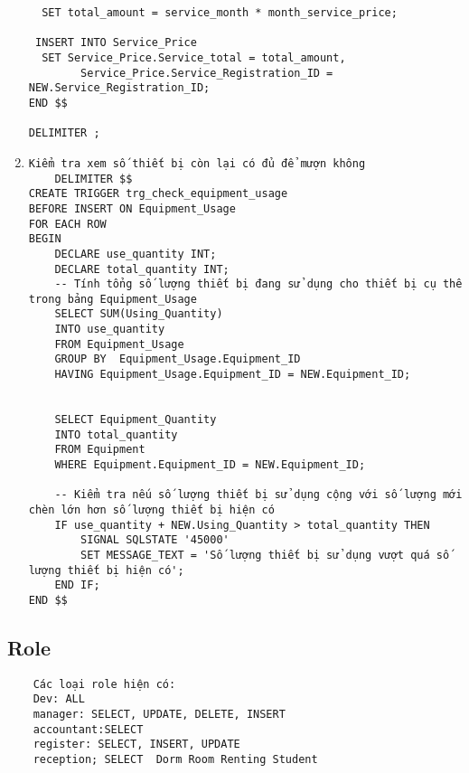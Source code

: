 \documentclass[a4paper,12pt]{article}
\begin{document}
\begin{enumerate}
\begin{verbatim}
  SET total_amount = service_month * month_service_price;

 INSERT INTO Service_Price 
  SET Service_Price.Service_total = total_amount,
		Service_Price.Service_Registration_ID = NEW.Service_Registration_ID;
END $$

DELIMITER ;
    \end{verbatim}
    \item \begin{verbatim}
Kiểm tra xem số thiết bị còn lại có đủ để mượn không
    DELIMITER $$
CREATE TRIGGER trg_check_equipment_usage
BEFORE INSERT ON Equipment_Usage
FOR EACH ROW
BEGIN
    DECLARE use_quantity INT;
    DECLARE total_quantity INT;
    -- Tính tổng số lượng thiết bị đang sử dụng cho thiết bị cụ thể trong bảng Equipment_Usage
    SELECT SUM(Using_Quantity)
    INTO use_quantity
    FROM Equipment_Usage
    GROUP BY  Equipment_Usage.Equipment_ID
	HAVING Equipment_Usage.Equipment_ID = NEW.Equipment_ID;


    SELECT Equipment_Quantity
    INTO total_quantity
    FROM Equipment
    WHERE Equipment.Equipment_ID = NEW.Equipment_ID;

    -- Kiểm tra nếu số lượng thiết bị sử dụng cộng với số lượng mới chèn lớn hơn số lượng thiết bị hiện có
    IF use_quantity + NEW.Using_Quantity > total_quantity THEN
        SIGNAL SQLSTATE '45000'
        SET MESSAGE_TEXT = 'Số lượng thiết bị sử dụng vượt quá số lượng thiết bị hiện có';
    END IF;
END $$
    \end{verbatim}
\end{enumerate}

\subsection{Role}
\begin{verbatim}
    Các loại role hiện có:
    Dev: ALL
    manager: SELECT, UPDATE, DELETE, INSERT
    accountant:SELECT 
    register: SELECT, INSERT, UPDATE
    reception; SELECT  Dorm Room Renting Student

\end{verbatim}
\end{document}
